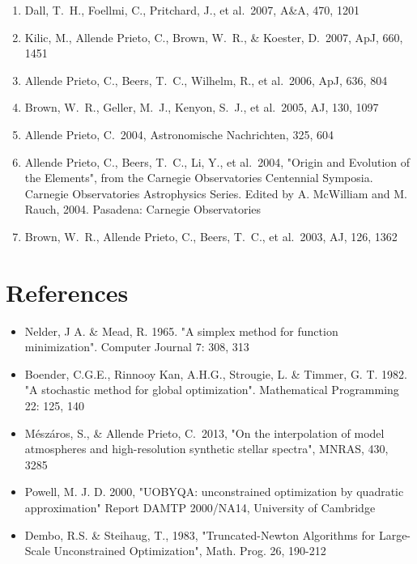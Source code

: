 \documentclass[12pt]{article}
\begin{document}
\begin{enumerate}
\item Dall, T.~H., Foellmi, C., Pritchard, J., et al.\ 2007, A\&A, 470, 1201 


\item Kilic, M., Allende 
Prieto, C., Brown, W.~R., \& Koester, D.\ 2007, ApJ, 660, 1451 


\item Allende Prieto, 
C., Beers, T.~C., Wilhelm, R., et al.\ 2006, ApJ, 636, 804 


\item Brown, W.~R., Geller, 
M.~J., Kenyon, S.~J., et al.\ 2005, AJ, 130, 1097 


\item Allende Prieto, C.\ 
2004, Astronomische Nachrichten, 325, 604 


\item Allende Prieto, 
C., Beers, T.~C., Li, Y., et al.\ 2004, 
"Origin and Evolution of the Elements", from the Carnegie Observatories Centennial Symposia. Carnegie Observatories Astrophysics Series. Edited by A. McWilliam and M. Rauch, 2004. Pasadena: Carnegie Observatories

\item Brown, W.~R., Allende 
Prieto, C., Beers, T.~C., et al.\ 2003, AJ, 126, 1362 

\end{enumerate}

\section{References}

\begin{itemize}
\item Nelder, J A. \&  Mead, R. 1965. "A simplex method for function minimization". 
Computer Journal 7: 308, 313
\item  Boender, C.G.E., Rinnooy Kan, A.H.G., Strougie, L. \& Timmer, G. T. 1982. 
"A stochastic method for global optimization". Mathematical Programming 22: 125, 140
\item M{\'e}sz{\'a}ros, S., \& Allende Prieto, C.\ 2013, "On the interpolation of 
model atmospheres and high-resolution synthetic stellar spectra", MNRAS, 430, 3285 
\item Powell, M. J. D. 2000, "UOBYQA: unconstrained optimization by
quadratic approximation"  Report DAMTP 2000/NA14, University of Cambridge
\item Dembo, R.S. \& Steihaug, T., 1983, "Truncated-Newton Algorithms for 
Large-Scale Unconstrained Optimization", Math. Prog. 26, 190-212 
\end{itemize}
\end{document}
